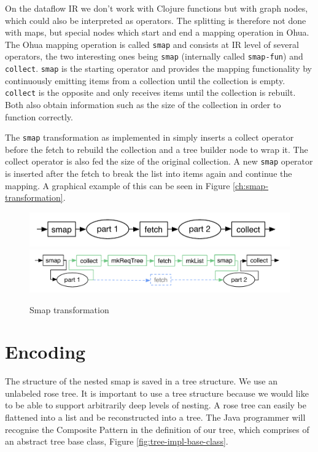 On the dataflow IR we don't work with Clojure functions but with graph nodes, which could also be interpreted as operators.
The splitting is therefore not done with maps, but special nodes which start and end a mapping operation in Ohua.
The Ohua mapping operation is called \texttt{smap} and consists at IR level of several operators, the two interesting ones being \texttt{smap} (internally called \texttt{smap-fun}) and \texttt{collect}.
\texttt{smap} is the starting operator and provides the mapping functionality by continuously emitting items from a collection until the collection is empty.
\texttt{collect} is the opposite and only receives items until the collection is rebuilt.
Both also obtain information such as the size of the collection in order to function correctly.

The \texttt{smap} transformation as implemented in \yauhau{} simply inserts a collect operator before the fetch to rebuild the collection and a tree builder node to wrap it.
The collect operator is also fed the size of the original collection.
A new \texttt{smap} operator is inserted after the fetch to break the list into items again and continue the mapping.
A graphical example of this can be seen in Figure \ref{ch:smap-transformation}.

\begin{figure}[h]
	\includegraphics[width=\textwidth]{Figures/smap-rewrite-original}
	\includegraphics[width=\textwidth]{Figures/smap-rewrite}
	\label{fig:smap-transformation}
	\caption{Smap transformation}
\end{figure}

\section{Encoding}

The structure of the nested smap is saved in a tree structure.
We use an unlabeled rose tree\cite{MALCOLM1990255}.
It is important to use a tree structure because we would like to be able to support arbitrarily deep levels of nesting.
A rose tree can easily be flattened into a list and be reconstructed into a tree.
The Java programmer will recognise the Composite Pattern\cite{gamma1995design} in the definition of our tree, which comprises of an abstract tree base class, Figure \ref{fig:tree-impl-base-class}.


